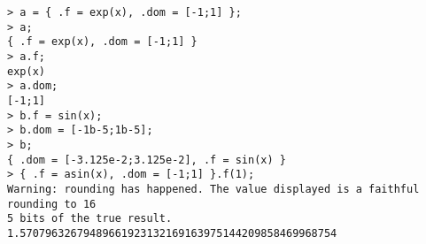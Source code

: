 \begin{center}\begin{minipage}{15cm}\begin{Verbatim}[frame=single]
> a = { .f = exp(x), .dom = [-1;1] };
> a;
{ .f = exp(x), .dom = [-1;1] }
> a.f;
exp(x)
> a.dom;
[-1;1]
> b.f = sin(x);
> b.dom = [-1b-5;1b-5];
> b;
{ .dom = [-3.125e-2;3.125e-2], .f = sin(x) }
> { .f = asin(x), .dom = [-1;1] }.f(1);
Warning: rounding has happened. The value displayed is a faithful rounding to 16
5 bits of the true result.
1.57079632679489661923132169163975144209858469968754
\end{Verbatim}
\end{minipage}\end{center}
